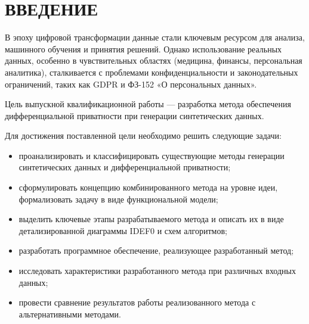 \chapter*{ВВЕДЕНИЕ}

В эпоху цифровой трансформации данные стали ключевым ресурсом для анализа, машинного обучения и принятия решений.
Однако использование реальных данных, особенно в чувствительных областях (медицина, финансы, персональная аналитика), сталкивается с проблемами конфиденциальности и законодательных ограничений, таких как GDPR и ФЗ-152 «О персональных данных».~\cite{gdpr, fz}

Цель выпускной квалификационной работы --- разработка метода обеспечения дифференциальной приватности при генерации синтетических данных. 

Для достижения поставленной цели необходимо решить следующие задачи:
\begin{itemize}[label=---]
	\item проанализировать и классифицировать существующие методы генерации синтетических данных и дифференциальной приватности;
	\item сформулировать концепцию комбинированного метода на уровне идеи, формализовать задачу в виде функциональной модели;
	\item выделить ключевые этапы разрабатываемого метода и описать их в виде детализированной диаграммы IDEF0 и схем алгоритмов;
	\item разработать программное обеспечение, реализующее разработанный метод;
	\item исследовать характеристики разработанного метода при различных входных
	данных;
	\item провести сравнение результатов работы реализованного метода с альтернативными методами.
\end{itemize}

\clearpage
